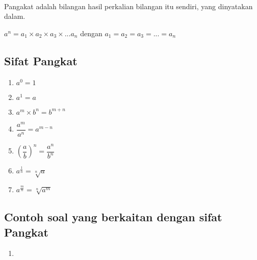 \paragraph*{}
	Pangakat adalah bilangan hasil perkalian bilangan itu sendiri, yang dinyatakan dalam.
	\begin{center}
		$a^n=a_1\times a_2 \times a_3 \times ... a_n$
		dengan $a_1=a_2=a_3=...=a_n$
	\end{center}
	\subsection{Sifat Pangkat}
	\begin{multicols}{2}
		\begin{enumerate}
			\item $a^0=1$
			\item $a^1=a$
			\item $a^m\times b^n=b^{m+n}$
			\item $\dfrac{a^m}{a^n}=a^{m-n} $
			\item $(\dfrac{a}{b})^n=\dfrac{a^n}{b^n}$
			\item $a^{\frac{1}{n}}=\sqrt[n]{a}$
			\item $a^{\frac{m}{n}}=\sqrt[n]{a^m} $
			\end{enumerate}
	\end{multicols}
	\subsection{Contoh soal yang berkaitan dengan sifat Pangkat}
	\begin{enumerate}
		\item 
		
	\end{enumerate}
	
	
			